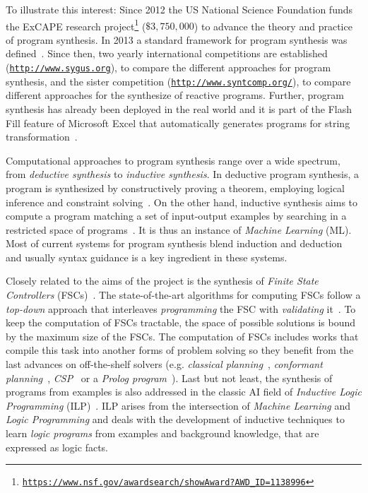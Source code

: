 \documentclass[10pt,a4paper]{paper}
\begin{document}
To illustrate this interest: Since 2012 the {\sc US National Science Foundation} funds the ExCAPE research project\footnote{\tt\url{https://www.nsf.gov/awardsearch/showAward?AWD_ID=1138996}} ($\$3,750,000$) to advance the theory and practice of program synthesis. In 2013 a standard framework for program synthesis was defined~\cite{alur2013syntax}. Since then, two yearly international competitions are established ({\small\tt\url{http://www.sygus.org}}), to compare the different approaches for program synthesis, and the sister competition ({\small\tt\url{http://www.syntcomp.org/}}), to compare different approaches for the synthesize of reactive programs. Further, program synthesis has already been deployed in the real world and it is part of the {\sc Flash Fill} feature of {\sc Microsoft Excel} that automatically generates programs for string transformation~\cite{gulwani2011automating}.

Computational approaches to program synthesis range over a wide spectrum, from {\em deductive synthesis} to {\em inductive synthesis}. In deductive program synthesis, a program is synthesized by constructively proving a theorem, employing logical inference and constraint solving~\cite{manna1986deductive}. On the other hand, inductive synthesis aims to compute a program matching a set of input-output examples by searching in a restricted space of programs~\cite{summers1977methodology,shapiro1983algorithmic}. It is thus an instance of {\em Machine Learning} (ML). Most of current systems for program synthesis blend induction and deduction~\cite{seshia2015combining} and usually syntax guidance is a key ingredient in these systems. 

Closely related to the aims of the project is the synthesis of {\it Finite State Controllers} (FSCs)~\cite{geffner:policies:IJCAI15}. The state-of-the-art algorithms for computing FSCs follow a {\it top-down} approach that interleaves {\it programming} the FSC with {\em validating} it~\cite{sergio:aprograming:ijcai16,segovia:FSC:JAIR2018}. To keep the computation of FSCs tractable, the space of possible solutions is bound by the maximum size of the FSCs. The computation of FSCs includes works that compile this task into another forms of problem solving so they benefit from the last advances on off-the-shelf solvers (e.g. {\em classical planning}~\cite{sergio:aprograming:icaps16}, {\em conformant planning}~\cite{Geffner:FSM:AAAI10}, {\em CSP}~\cite{Infantes:FSC:ECAI2010} or a {\em Prolog program}~\cite{Giacomo:FSM:ICAPS13}). Last but not least, the synthesis of programs from examples is also addressed in the classic AI field of {\em Inductive Logic Programming} (ILP)~\cite{muggleton1991inductive,Raedt:relationalML:book2008}. ILP arises from the intersection of {\em Machine Learning} and {\em Logic Programming} and deals with the development of inductive techniques to learn {\em logic programs} from examples and background knowledge, that are expressed as logic facts.
\end{document}
